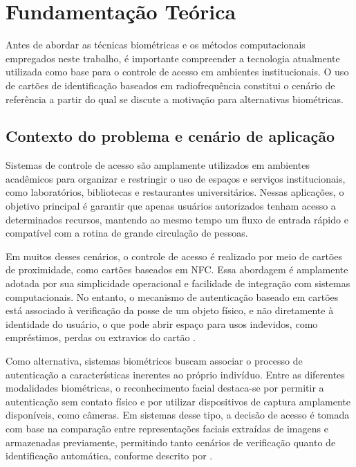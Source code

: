 \chapter{Fundamentação Teórica}
\label{chap:fundamentacao}

Antes de abordar as técnicas biométricas e os métodos computacionais empregados neste trabalho, é importante compreender a tecnologia atualmente utilizada como base para o controle de acesso em ambientes institucionais. O uso de cartões de identificação baseados em radiofrequência constitui o cenário de referência a partir do qual se discute a motivação para alternativas biométricas.


\section{Contexto do problema e cenário de aplicação}

Sistemas de controle de acesso são amplamente utilizados em ambientes acadêmicos para organizar e restringir o uso de espaços e serviços institucionais, como laboratórios, bibliotecas e restaurantes universitários. Nessas aplicações, o objetivo principal é garantir que apenas usuários autorizados tenham acesso a determinados recursos, mantendo ao mesmo tempo um fluxo de entrada rápido e compatível com a rotina de grande circulação de pessoas.

Em muitos desses cenários, o controle de acesso é realizado por meio de cartões de proximidade, como cartões baseados em \acs{NFC}. Essa abordagem é amplamente adotada por sua simplicidade operacional e facilidade de integração com sistemas computacionais. No entanto, o mecanismo de autenticação baseado em cartões está associado à verificação da posse de um objeto físico, e não diretamente à identidade do usuário, o que pode abrir espaço para usos indevidos, como empréstimos, perdas ou extravios do cartão \cite{masyuk2019rfid}.

Como alternativa, sistemas biométricos buscam associar o processo de autenticação a características inerentes ao próprio indivíduo. Entre as diferentes modalidades biométricas, o reconhecimento facial destaca-se por permitir a autenticação sem contato físico e por utilizar dispositivos de captura amplamente disponíveis, como câmeras. Em sistemas desse tipo, a decisão de acesso é tomada com base na comparação entre representações faciais extraídas de imagens e armazenadas previamente, permitindo tanto cenários de verificação quanto de identificação automática, conforme descrito por \textcite{parmar2013face}.

